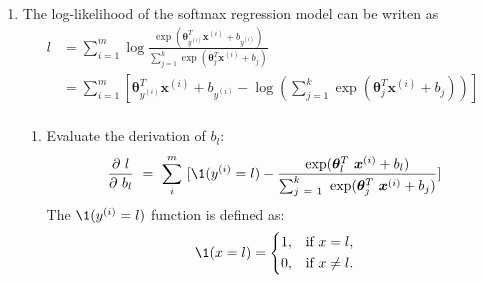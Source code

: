 \documentclass[a4paper]{article}
\begin{document}
\begin{enumerate}
  \setlength{\itemsep}{3\parskip}
\item The log-likelihood of the softmax regression model can be writen as  
\begin{equation*}
    \begin{aligned}
      l 
      &= \sum_{i = 1}^m \log \frac{\exp (\boldsymbol{\theta}^T_{y^{(i)}} \boldsymbol{x}^{(i)}+b_{y^{(i)} })}{\sum_{j = 1}^k \exp(\boldsymbol{\theta}^T_j \boldsymbol{x}^{(i)}+b_j)}\\
      &= \sum_{i = 1}^m [\boldsymbol{\theta}^T_{y^{(i)}} \boldsymbol{x}^{(i)}+b_{y^{(i)}} - \log (\sum_{j = 1}^k \exp(\boldsymbol{\theta}^T_j \boldsymbol{x}^{(i)}+b_j))]\\
    \end{aligned}
    \label{eq:svm:p}
  \end{equation*}

  \begin{enumerate}
  \item Evaluate the derivation of $b_l$:
    \begin{equation*}
      \frac{\partial l}{\partial b_l} = \sum_i^m [\1 (y^{(i)}=l) - \frac{\exp(\boldsymbol{\theta}^T_l \boldsymbol{x}^{(i)}+b_l)}{\sum_{j = 1}^k \exp(\boldsymbol{\theta}^T_j \boldsymbol{x}^{(i)}+b_j)}]
    \end{equation*}
    \noindent The $\1 (y^{(i)}=l)$ function is defined as:
    \begin{equation*}
      \1(x=l)=
      \left\{
      \begin{aligned}
        1, &\quad\text{if}~ x = l,\\
        0, &\quad\text{if}~ x \neq l.
      \end{aligned}
      \right.
    \end{equation*}
   

\end{enumerate}
\end{enumerate}
\end{document}

